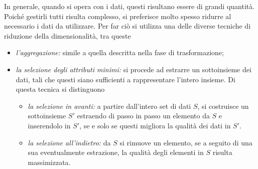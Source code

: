 \documentclass{subfiles}
\begin{document}
In generale, quando si opera con i dati, questi risultano essere di grandi quantità.
Poiché gestirli tutti risulta complesso, si preferisce molto spesso ridurre al necessario i dati da utilizzare.
Per far ciò si utilizza una delle diverse tecniche di riduzione della dimensionalità, tra queste
\begin{itemize}
    \item \emph{l'aggregazione:} simile a quella descritta nella fase di trasformazione;
    \item \emph{la selezione degli attributi minimi:} si procede ad estrarre un sottoinsieme dei dati,
          tali che questi siano sufficienti a rappresentare l'intero insieme.
          Di questa tecnica si distinguono
          \begin{itemize}
              \item \emph{la selezione in avanti:} a partire dall'intero set di dati $S$,
                    si costruisce un sottoinsieme $S'$ estraendo di passo in passo un elemento da $S$ e inserendolo in $S'$,
                    se e solo se questi migliora la qualità dei dati in $S'$.

              \item \emph{la selezione all'indietro:} da $S$ si rimuove un elemento, se a seguito di una sua eventualmente estrazione,
                    la qualità degli elementi in $S$ risulta massimizzata.
          \end{itemize}
\end{itemize}
\end{document}

